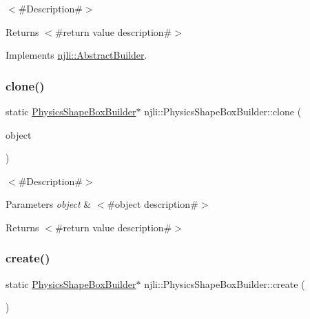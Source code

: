 $<$\#\+Description\#$>$

\begin{DoxyReturn}{Returns}
$<$\#return value description\#$>$ 
\end{DoxyReturn}


Implements \mbox{\hyperlink{classnjli_1_1_abstract_builder_aa1d220053e182c37b31b427499c6eacf}{njli\+::\+Abstract\+Builder}}.

\mbox{\label{classnjli_1_1_physics_shape_box_builder_a41cbe409e54e6c6411144e9a3507fd61}} 
\subsubsection{\texorpdfstring{clone()}{clone()}}
{\footnotesize\ttfamily static \mbox{\hyperlink{classnjli_1_1_physics_shape_box_builder}{Physics\+Shape\+Box\+Builder}}$\ast$ njli\+::\+Physics\+Shape\+Box\+Builder\+::clone (\begin{DoxyParamCaption}\item[{const \mbox{\hyperlink{classnjli_1_1_physics_shape_box_builder}{Physics\+Shape\+Box\+Builder}} \&}]{object }\end{DoxyParamCaption})\hspace{0.3cm}{\ttfamily [static]}}

$<$\#\+Description\#$>$


\begin{DoxyParams}{Parameters}
{\em object} & $<$\#object description\#$>$\\
\hline
\end{DoxyParams}
\begin{DoxyReturn}{Returns}
$<$\#return value description\#$>$ 
\end{DoxyReturn}
\mbox{\label{classnjli_1_1_physics_shape_box_builder_abebd1fabb504a63b33ee01edff45117e}} 
\subsubsection{\texorpdfstring{create()}{create()}}
{\footnotesize\ttfamily static \mbox{\hyperlink{classnjli_1_1_physics_shape_box_builder}{Physics\+Shape\+Box\+Builder}}$\ast$ njli\+::\+Physics\+Shape\+Box\+Builder\+::create (\begin{DoxyParamCaption}{ }\end{DoxyParamCaption})\hspace{0.3cm}{\ttfamily [static]}}


